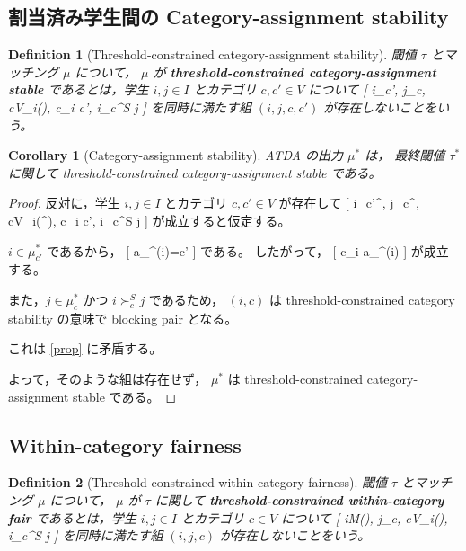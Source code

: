 \documentclass[
  12pt,
  a4paper,
  oneside,
  onecolumn,
  titlepage,
  final
]{jsarticle}
\newtheorem{corollary}{Corollary}
\newtheorem{definition}{Definition}
\newcommand{\1}{\mathbf{1}}
\begin{document}
\subsection{割当済み学生間の Category-assignment stability}

\begin{definition}[Threshold-constrained category-assignment stability]
閾値 $\tau$ とマッチング $\mu$ について，
$\mu$ が
\textbf{threshold-constrained category-assignment stable}
であるとは，学生 $i,j\in I$ とカテゴリ $c,c'\in V$ について
[
i\in\mu_{c'},
\qquad
j\in\mu_c,
\qquad
c\in V_i(\tau),
\qquad
c\succ_i c',
\qquad
i\succ_c^S j
]
を同時に満たす組 $(i,j,c,c')$ が存在しないことをいう。
\end{definition}

\begin{corollary}[Category-assignment stability]
\label{cor}
\textsc{ATDA} の出力 $\mu^\ast$ は，
最終閾値 $\tau^\ast$ に関して
threshold-constrained category-assignment stable である。
\end{corollary}

\begin{proof}
反対に，学生 $i,j\in I$ とカテゴリ $c,c'\in V$ が存在して
[
i\in\mu_{c'}^\ast,
\qquad
j\in\mu_c^\ast,
\qquad
c\in V_i(\tau^\ast),
\qquad
c\succ_i c',
\qquad
i\succ_c^S j
]
が成立すると仮定する。

$i\in\mu_{c'}^\ast$ であるから，
[
a_{\mu^\ast}(i)=c'
]
である。
したがって，
[
c\succ_i a_{\mu^\ast}(i)
]
が成立する。

また，$j\in\mu_c^\ast$ かつ $i\succ_c^S j$ であるため，
$(i,c)$ は threshold-constrained category stability の意味で
blocking pair となる。

これは
\cref{prop}
に矛盾する。

よって，そのような組は存在せず，
$\mu^\ast$ は threshold-constrained category-assignment stable である。
\end{proof}

\subsection{Within-category fairness}

\begin{definition}[Threshold-constrained within-category fairness]
閾値 $\tau$ とマッチング $\mu$ について，
$\mu$ が $\tau$ に関して
\textbf{threshold-constrained within-category fair}
であるとは，学生 $i,j\in I$ とカテゴリ $c\in V$ について
[
i\notin M(\mu),
\qquad
j\in\mu_c,
\qquad
c\in V_i(\tau),
\qquad
i\succ_c^S j
]
を同時に満たす組 $(i,j,c)$ が存在しないことをいう。
\end{definition}
\end{document}

